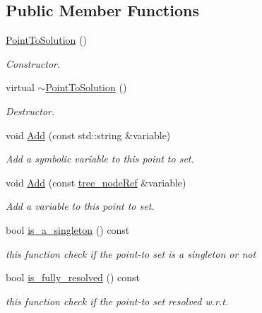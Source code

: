 \subsection*{Public Member Functions}
\begin{DoxyCompactItemize}
\item 
\hyperlink{structPointToSolution_a245e8221f21315da8cb550bac8842887}{Point\+To\+Solution} ()
\begin{DoxyCompactList}\small\item\em Constructor. \end{DoxyCompactList}\item 
virtual \hyperlink{structPointToSolution_ae7c6ebc74bd9faa820746e7536ac0230}{$\sim$\+Point\+To\+Solution} ()
\begin{DoxyCompactList}\small\item\em Destructor. \end{DoxyCompactList}\item 
void \hyperlink{structPointToSolution_a1ac5afb047b8a7d6f94c1ec28a99ba5d}{Add} (const std\+::string \&variable)
\begin{DoxyCompactList}\small\item\em Add a symbolic variable to this point to set. \end{DoxyCompactList}\item 
void \hyperlink{structPointToSolution_ae6f6414be5312f645fb4cc3dace51a41}{Add} (const \hyperlink{tree__node_8hpp_a6ee377554d1c4871ad66a337eaa67fd5}{tree\+\_\+node\+Ref} \&variable)
\begin{DoxyCompactList}\small\item\em Add a variable to this point to set. \end{DoxyCompactList}\item 
bool \hyperlink{structPointToSolution_a20d57034a0bbf4ff2bca253263f40de1}{is\+\_\+a\+\_\+singleton} () const
\begin{DoxyCompactList}\small\item\em this function check if the point-\/to set is a singleton or not \end{DoxyCompactList}\item 
bool \hyperlink{structPointToSolution_a2c0a68c76431841d20f59bd6f7a59ee2}{is\+\_\+fully\+\_\+resolved} () const
\begin{DoxyCompactList}\small\item\em this function check if the point-\/to set resolved w.\+r.\+t. \end{DoxyCompactList}\item 

\end{DoxyCompactItemize}
